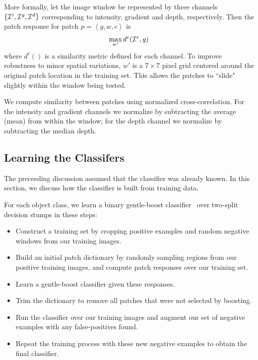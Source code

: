 \documentclass[letterpaper, 10 pt, conference]{ieeeconf}  %
\begin{document}
More formally, let the image window be represented by three channels
$\{{\cal I}^i, {\cal I}^g, {\cal I}^d\}$ corresponding to intensity,
gradient and depth, respectively. Then the patch response for patch
$p = \left<g, w, c\right>$ is
\[
  \max_{w'} d^c({\cal I}^c, g)
\]
where $d^c()$ is a similarity metric defined for each channel.  To improve
robustness to minor spatial variations, $w'$ is a $7 \times 7$ pixel grid
centered around the original patch location in the training set. This allows
the patches to ``slide" slightly within the window being tested.

We compute similarity between patches using normalized cross-correlation.  For
the intensity and gradient channels we normalize by subtracting the average
(mean) from within the window; for the depth channel we normalize by
subtracting the median depth.

\subsection{Learning the Classifers}

The preceeding discussion assumed that the classifier was already known. In
this section, we discuss how the classifier is built from training data.

For each object class, we learn a binary gentle-boost
classifier~\cite{bib:friedman} over two-split decision stumps in these steps:

\begin{itemize}
\item Construct a training set by cropping positive examples and random negative
windows from our training images.
\item Build an initial patch dictionary by randomly sampling regions from our positive training images, and compute patch responses over our training set.
\item Learn a gentle-boost classifier given these responses.
\item Trim the dictionary to remove all patches that were not selected by boosting.
\item Run the classifier over our training images and augment our set of negative examples with any false-positives found.
\item Repeat the training process with these new negative examples to obtain the final classifier.
\end{itemize}
\end{document}
